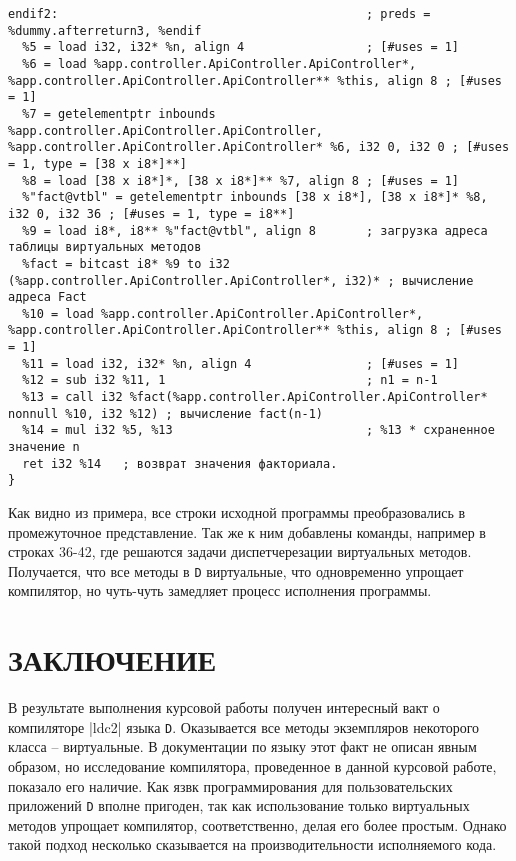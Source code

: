 \documentclass{studrep}
\begin{document}
\begin{verbatim}
endif2:                                           ; preds = %dummy.afterreturn3, %endif
  %5 = load i32, i32* %n, align 4                 ; [#uses = 1]
  %6 = load %app.controller.ApiController.ApiController*, %app.controller.ApiController.ApiController** %this, align 8 ; [#uses = 1]
  %7 = getelementptr inbounds %app.controller.ApiController.ApiController, %app.controller.ApiController.ApiController* %6, i32 0, i32 0 ; [#uses = 1, type = [38 x i8*]**]
  %8 = load [38 x i8*]*, [38 x i8*]** %7, align 8 ; [#uses = 1]
  %"fact@vtbl" = getelementptr inbounds [38 x i8*], [38 x i8*]* %8, i32 0, i32 36 ; [#uses = 1, type = i8**]
  %9 = load i8*, i8** %"fact@vtbl", align 8       ; загрузка адреса таблицы виртуальных методов
  %fact = bitcast i8* %9 to i32 (%app.controller.ApiController.ApiController*, i32)* ; вычисление адреса Fact
  %10 = load %app.controller.ApiController.ApiController*, %app.controller.ApiController.ApiController** %this, align 8 ; [#uses = 1]
  %11 = load i32, i32* %n, align 4                ; [#uses = 1]
  %12 = sub i32 %11, 1                            ; n1 = n-1
  %13 = call i32 %fact(%app.controller.ApiController.ApiController* nonnull %10, i32 %12) ; вычисление fact(n-1)
  %14 = mul i32 %5, %13                           ; %13 * схраненное значение n
  ret i32 %14   ; возврат значения факториала.
}
\end{verbatim}

Как видно из примера, все строки исходной программы преобразовались в промежуточное представление.  Так же к ним добавлены команды, например в строках 36-42, где решаются задачи диспетчерезации виртуальных методов.  Получается, что все методы в \verb|D| виртуальные, что одновременно упрощает компилятор, но чуть-чуть замедляет процесс исполнения программы.

\chapter*{ЗАКЛЮЧЕНИЕ}

В результате выполнения курсовой работы получен интересный вакт о компиляторе \vrb|ldc2| языка \verb|D|.  Оказывается все методы экземпляров некоторого класса -- виртуальные.  В документации по языку этот факт не описан явным образом, но исследование компилятора, проведенное в данной курсовой работе, показало его наличие.  Как язвк программирования для пользовательских приложений \verb|D| вполне пригоден, так как использование только виртуальных методов упрощает компилятор, соответственно, делая его более простым. Однако такой подход несколько сказывается на производительности исполняемого кода.
\end{document}
